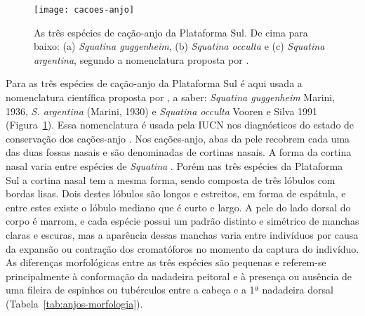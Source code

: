 \documentclass[a4paper,11pt,twoside,showtrims,onecolumn,openright,final]{memoir}
\begin{document}
%
%

\begin{figure}
\begin{center}
\texttt{[image: cacoes-anjo]}
\end{center}
\caption[As três espécies de cação-anjo da Plataforma Sul: 
	 \emph{Squatina guggenheim}, \emph{Squatina occulta} e 
	 \emph{Squatina argentina}]
	{As três espécies de cação-anjo da Plataforma Sul. 
	 De cima para baixo: (a) \emph{Squatina guggenheim}, (b) \emph{Squatina occulta} e 
	 (c) \emph{Squatina argentina}, segundo a nomenclatura proposta por \citet{vooren1991}.}  %
\label{fig:anjos-3spp}
\end{figure}


Para as três espécies de cação-anjo da Plataforma Sul é aqui usada a nomenclatura 
científica proposta por \citet{vooren1991}, %
a saber:  \emph{Squatina guggenheim} Marini, 1936, \emph{S. argentina} (Marini, 1930) 
e  \emph{Squatina occulta} Vooren e Silva 1991 (Figura~\ref{fig:anjos-3spp}). %
Essa nomenclatura é usada pela IUCN nos diagnósticos do estado de 
conservação dos cações-anjo \citep{chiaramonte2004a,chiaramonte2004b}. %
Nos cações-anjo, abas da pele recobrem cada uma das duas fossas nasais e são denominadas 
de cortinas nasais.  A forma da cortina nasal varia entre espécies de \emph{Squatina} \citep{COMPAGNO1984A}. %
Porém nas três espécies da Plataforma Sul a cortina nasal tem a mesma forma, sendo composta de 
três lóbulos com bordas lisas. Dois destes lóbulos são longos e estreitos, em forma de espátula, 
e entre estes existe o lóbulo mediano que é curto e largo. A pele do lado dorsal do corpo é marrom, 
e cada espécie possui um padrão distinto e simétrico de manchas claras e escuras, mas a 
aparência dessas manchas varia entre indivíduos por causa da expansão ou contração dos 
cromatóforos no momento da captura do indivíduo. As diferenças morfológicas entre as três 
espécies são pequenas e referem-se principalmente à conformação da nadadeira peitoral e 
à presença ou ausência de uma fileira de espinhos ou tubérculos entre a cabeça 
e a 1ª nadadeira dorsal (Tabela~\ref{tab:anjos-morfologia}). %

%
%
\end{document}
